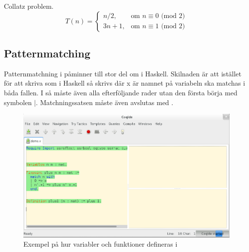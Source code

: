 Collatz problem.
\begin{equation}
T(n) = \left\{\begin{matrix} n/2, & \mbox{om }n\equiv0\mbox{ (mod 2)} \\ 3n+1,
                         & \mbox{om }n\equiv1\mbox{ (mod 2)} \end{matrix}\right.
\end{equation}

\subsection{Patternmatching}
Patternmatchning i \coq påminner till stor del om  i Haskell.
Skilnaden är att istället för att skriva  som i Haskell
så skrivs  där x är namnet på variabeln ska matchas i
båda fallen. I \coq så måste även alla efterföljande rader utan den första
börja med symbolen $|$. Matchningssatsen måste även avslutas med .

\begin{figure}[H]
  \centering
  \includegraphics[width=150mm]{images/Variables_and_Functions}
  \caption[Variabler och funktioner]
   {Exempel på hur variabler och funktioner defineras i \coq}
\end{figure}
